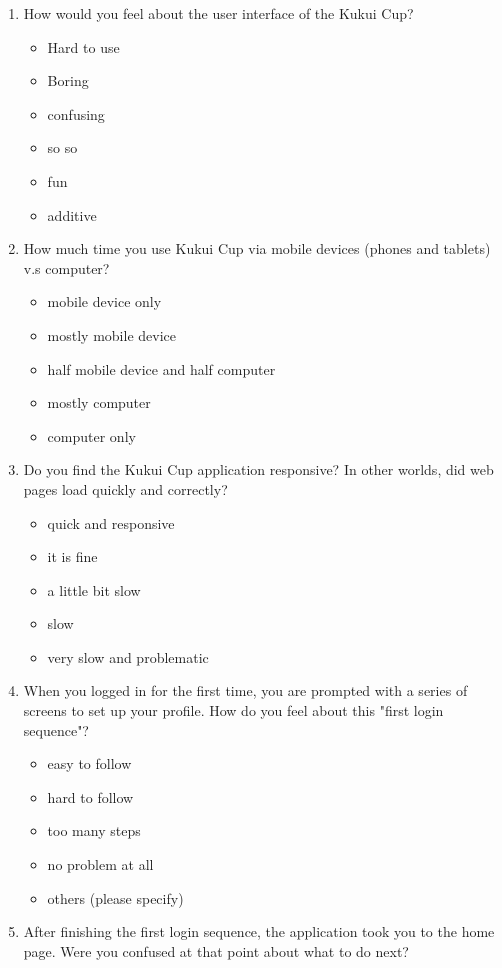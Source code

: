 \documentclass[11pt]{article}
\begin{document}
\begin{enumerate}

\item How would you feel about the user interface of the Kukui Cup? 
\begin{itemize}
\item Hard to use
\item Boring
\item confusing
\item so so
\item fun
\item additive
\end{itemize}

\item How much time you use Kukui Cup via mobile devices (phones and tablets) v.s computer?
\begin {itemize}
\item mobile device only
\item mostly mobile device
\item half mobile device and half computer
\item mostly computer
\item computer only
\end{itemize}

\item Do you find the Kukui Cup application responsive? In other worlds, did web pages load quickly and correctly?
\begin {itemize}
\item quick and responsive
\item it is fine
\item a little bit slow
\item slow
\item very slow and problematic
\end{itemize}

\item When you logged in for the first time, you are prompted with a series of screens to set up your profile. How do you feel about this "first login sequence"?
\begin{itemize}
\item easy to follow
\item hard to follow
\item too many steps
\item no problem at all
\item others (please specify)
\end{itemize}

\item After finishing the first login sequence, the application took you to the home page.  Were you confused at that point about what to do next? 


\end{enumerate}
\end{document}

